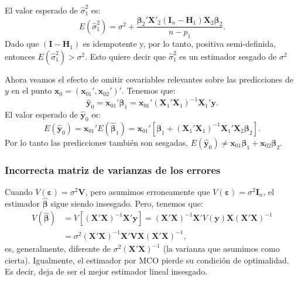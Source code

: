 \documentclass[
]{article}
\begin{document}
El valor esperado de \(\widehat{\sigma}^{2}_{1}\) es:
\[
E(\widehat{\sigma}^{2}_{1}) = \sigma^{2} + \frac{\boldsymbol \beta_{2}'\boldsymbol X'_{2}(\boldsymbol I_{n} - \boldsymbol H_{1})\boldsymbol X_{2}\boldsymbol \beta_{2}}{n-p_{1}}.
\]
Dado que \((\boldsymbol I- \boldsymbol H_{1})\) es idempotente y, por lo tanto, positiva semi-definida, entonces \(E(\widehat{\sigma}_{1}^{2}) > \sigma^{2}\). Esto quiere decir que \(\widehat{\sigma}^{2}_{1}\) es un estimador sesgado de \(\sigma^{2}\)

Ahora veamos el efecto de omitir covariables relevantes sobre las predicciones de \(y\) en el punto \(\boldsymbol x_{0} = (\boldsymbol x_{01}', \boldsymbol x_{02}')'\). Tenemos que:
\[
\widehat{\boldsymbol y}_{0} = \boldsymbol x_{01}'\widehat{\boldsymbol \beta}_{1} = \boldsymbol x_{01}'(\boldsymbol X_{1}'\boldsymbol X_{1})^{-1}\boldsymbol X_{1}'\boldsymbol y.
\]
El valor esperado de \(\widehat{\boldsymbol y}_{0}\) es:
\[
E(\widehat{\boldsymbol y}_{0}) = \boldsymbol x_{01}'E(\widehat{\boldsymbol \beta}_{1}) = \boldsymbol x_{01}'\left[ \boldsymbol \beta_{1} +  (\boldsymbol X_{1}'\boldsymbol X_{1})^{-1}\boldsymbol X_{1}'\boldsymbol X_{2}\boldsymbol \beta_{2} \right]. 
\]
Por lo tanto las predicciones también son sesgadas, \(E(\widehat{\boldsymbol y}_{0}) \neq \boldsymbol x_{01}\boldsymbol \beta_{1} + \boldsymbol x_{02}\boldsymbol \beta_{2}\).

\hypertarget{incorrecta-matriz-de-varianzas-de-los-errores}{%
\subsubsection{Incorrecta matriz de varianzas de los errores}\label{incorrecta-matriz-de-varianzas-de-los-errores}}

Cuando \(V(\boldsymbol \varepsilon) = \sigma^{2}\boldsymbol V\), pero asumimos erroneamente que \(V(\boldsymbol \varepsilon) = \sigma^{2}\boldsymbol I_{n}\), el estimador \(\widehat{\boldsymbol \beta}\) sigue siendo insesgado. Pero, tenemos que:
\begin{equation}
\begin{split}
V(\widehat{\boldsymbol \beta}) &= V\left[ (\boldsymbol X'\boldsymbol X)^{-1}\boldsymbol X'\boldsymbol y\right] = (\boldsymbol X'\boldsymbol X)^{-1}\boldsymbol X'V(\boldsymbol y)\boldsymbol X(\boldsymbol X'\boldsymbol X)^{-1} \\
&= \sigma^{2}(\boldsymbol X'\boldsymbol X)^{-1}\boldsymbol X'\boldsymbol V\boldsymbol X(\boldsymbol X'\boldsymbol X)^{-1},
\end{split}
\nonumber
\end{equation}
es, generalmente, diferente de \(\sigma^{2}(\boldsymbol X'\boldsymbol X)^{-1}\) (la varianza que asumimos como cierta). Igualmente, el estimador por MCO pierde su condición de optimalidad. Es decir, deja de ser el mejor estimador lineal insesgado.
\end{document}
